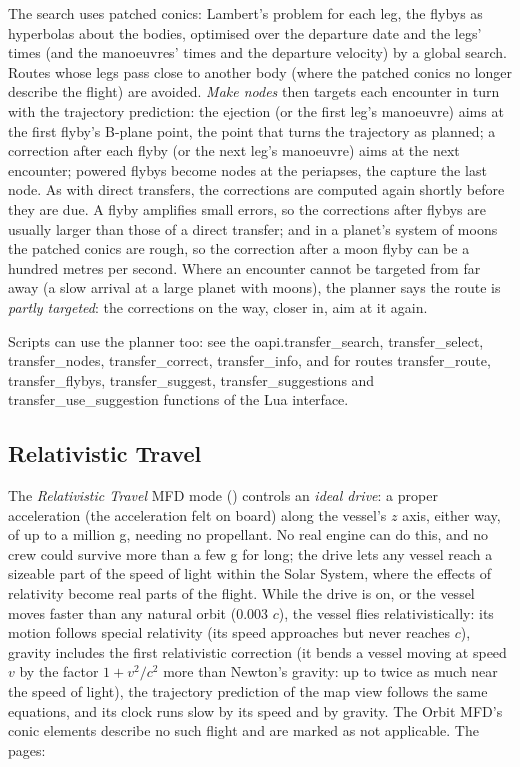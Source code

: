 \documentclass[Orbiter User Manual.tex]{subfiles}
\begin{document}
The search uses patched conics: Lambert's problem for each leg, the flybys as hyperbolas about the bodies, optimised over the departure date and the legs' times (and the manoeuvres' times and the departure velocity) by a global search. Routes whose legs pass close to another body (where the patched conics no longer describe the flight) are avoided. \textit{Make nodes} then targets each encounter in turn with the trajectory prediction: the ejection (or the first leg's manoeuvre) aims at the first flyby's B-plane point, the point that turns the trajectory as planned; a correction after each flyby (or the next leg's manoeuvre) aims at the next encounter; powered flybys become nodes at the periapses, the capture the last node. As with direct transfers, the corrections are computed again shortly before they are due. A flyby amplifies small errors, so the corrections after flybys are usually larger than those of a direct transfer; and in a planet's system of moons the patched conics are rough, so the correction after a moon flyby can be a hundred metres per second. Where an encounter cannot be targeted from far away (a slow arrival at a large planet with moons), the planner says the route is \textit{partly targeted}: the corrections on the way, closer in, aim at it again.

\noindent
Scripts can use the planner too: see the oapi.transfer\_search, transfer\_select, transfer\_nodes, transfer\_correct, transfer\_info, and for routes transfer\_route, transfer\_flybys, transfer\_suggest, transfer\_suggestions and transfer\_use\_suggestion functions of the Lua interface.


\subsection{Relativistic Travel}
\label{ssec:mfd_reltravel}
The \textit{Relativistic Travel} MFD mode (\Shift{}) controls an \textit{ideal drive}: a proper acceleration (the acceleration felt on board) along the vessel's $z$ axis, either way, of up to a million g, needing no propellant. No real engine can do this, and no crew could survive more than a few g for long; the drive lets any vessel reach a sizeable part of the speed of light within the Solar System, where the effects of relativity become real parts of the flight. While the drive is on, or the vessel moves faster than any natural orbit (0.003 $c$), the vessel flies relativistically: its motion follows special relativity (its speed approaches but never reaches $c$), gravity includes the first relativistic correction (it bends a vessel moving at speed $v$ by the factor $1 + v^2/c^2$ more than Newton's gravity: up to twice as much near the speed of light), the trajectory prediction of the map view follows the same equations, and its clock runs slow by its speed and by gravity. The Orbit MFD's conic elements describe no such flight and are marked as not applicable. The pages:
\end{document}
